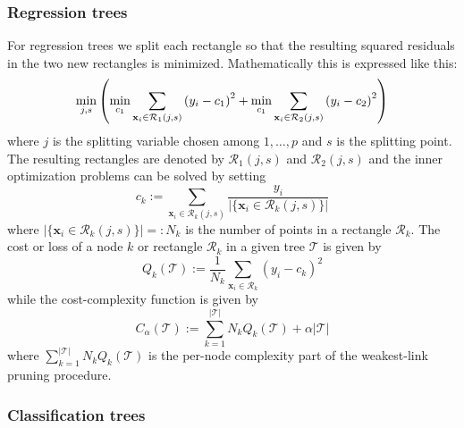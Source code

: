\documentclass[a4paper, 12pt]{scrartcl}
\begin{document}
\subsubsection*{Regression trees}
\begin{algorithm}
For regression trees we split each rectangle so that the resulting squared residuals in the two new rectangles is minimized.
Mathematically this is expressed like this:
	\begin{equation*}
	\operatornamewithlimits{min}_{j,s}\left(\operatornamewithlimits{min}_{c_1}\sum_{\mathbf{x}_i\in \mathcal{R}_1\left(j,s\right)}\left(y_i-c_1\right)^2+\operatornamewithlimits{min}_{c_1}\sum_{\mathbf{x}_i\in \mathcal{R}_2\left(j,s\right)}\left(y_i-c_2\right)^2\right)
	\end{equation*}
	where $j$ is the splitting variable chosen among $1,\dots,p$ and $s$ is the splitting point.
The resulting rectangles are denoted by $\mathcal{R}_1\left(j,s\right)$ and $\mathcal{R}_2\left(j,s\right)$ and the inner optimization problems can be solved by setting
\begin{equation*}
c_k := \sum_{\mathbf{x}_i\in \mathcal{R}_k\left(j,s\right)}\frac{y_i}{|\{\mathbf{x}_i\in \mathcal{R}_k\left(j,s\right)\}|}
\end{equation*}
where $|\{\mathbf{x}_i\in \mathcal{R}_k\left(j,s\right)\}|=:N_k$ is the number of points in a rectangle $\mathcal{R}_k$. 
The cost or loss of a node $k$ or rectangle $\mathcal{R}_k$ in a given tree $\mathcal{T}$ is given by 
\begin{equation*}
	Q_k\left(\mathcal{T}\right):=\frac{1}{N_k}\sum_{\mathbf{x}_i\in \mathcal{R}_k}\left(y_i-c_k\right)^2
\end{equation*}
while the cost-complexity function is given by
\begin{equation*}
	C_\alpha\left(\mathcal{T}\right):=\sum_{k=1}^{|\mathcal{T}|}N_kQ_k\left(\mathcal{T}\right)+\alpha|\mathcal{T}|
\end{equation*}
where $\sum_{k=1}^{|\mathcal{T}|}N_kQ_k\left(\mathcal{T}\right)$ is the per-node complexity part of the weakest-link pruning procedure.
\end{algorithm}

\subsubsection*{Classification trees}
\end{document}
